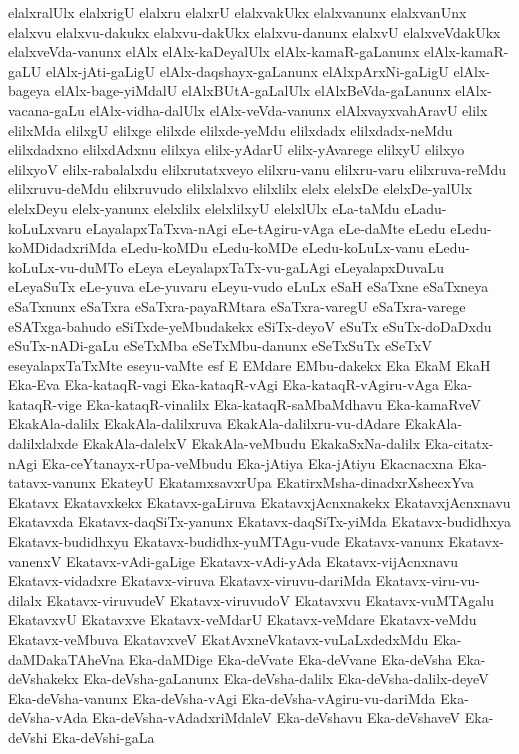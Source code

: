 {elalxralUlx
elalxrigU
elalxru
elalxrU
elalxvakUkx
elalxvanunx
elalxvanUnx
elalxvu
elalxvu-dakukx
elalxvu-dakUkx
elalxvu-danunx
elalxvU
elalxveVdakUkx
elalxveVda-vanunx
elAlx
elAlx-kaDeyalUlx
elAlx-kamaR-gaLanunx
elAlx-kamaR-gaLU
elAlx-jAti-gaLigU
elAlx-daqshayx-gaLanunx
elAlxpArxNi-gaLigU
elAlx-bageya
elAlx-bage-yiMdalU
elAlxBUtA-gaLalUlx
elAlxBeVda-gaLanunx
elAlx-vacana-gaLu
elAlx-vidha-dalUlx
elAlx-veVda-vanunx
elAlxvayxvahAravU
elilx
elilxMda
elilxgU
elilxge
elilxde
elilxde-yeMdu
elilxdadx
elilxdadx-neMdu
elilxdadxno
elilxdAdxnu
elilxya
elilx-yAdarU
elilx-yAvarege
elilxyU
elilxyo
elilxyoV
elilx-rabalalxdu
elilxrutatxveyo
elilxru-vanu
elilxru-varu
elilxruva-reMdu
elilxruvu-deMdu
elilxruvudo
elilxlalxvo
elilxlilx
elelx
elelxDe
elelxDe-yalUlx
elelxDeyu
elelx-yanunx
elelxlilx
elelxlilxyU
elelxlUlx
eLa-taMdu
eLadu-koLuLxvaru
eLayalapxTaTxva-nAgi
eLe-tAgiru-vAga
eLe-daMte
eLedu
eLedu-koMDidadxriMda
eLedu-koMDu
eLedu-koMDe
eLedu-koLuLx-vanu
eLedu-koLuLx-vu-duMTo
eLeya
eLeyalapxTaTx-vu-gaLAgi
eLeyalapxDuvaLu
eLeyaSuTx
eLe-yuva
eLe-yuvaru
eLeyu-vudo
eLuLx
eSaH
eSaTxne
eSaTxneya
eSaTxnunx
eSaTxra
eSaTxra-payaRMtara
eSaTxra-varegU
eSaTxra-varege
eSATxga-bahudo
eSiTxde-yeMbudakekx
eSiTx-deyoV
eSuTx
eSuTx-doDaDxdu
eSuTx-nADi-gaLu
eSeTxMba
eSeTxMbu-danunx
eSeTxSuTx
eSeTxV
eseyalapxTaTxMte
eseyu-vaMte
esf
E
EMdare
EMbu-dakekx
Eka
EkaM
EkaH
Eka-Eva
Eka-kataqR-vagi
Eka-kataqR-vAgi
Eka-kataqR-vAgiru-vAga
Eka-kataqR-vige
Eka-kataqR-vinalilx
Eka-kataqR-saMbaMdhavu
Eka-kamaRveV
EkakAla-dalilx
EkakAla-dalilxruva
EkakAla-dalilxru-vu-dAdare
EkakAla-dalilxlalxde
EkakAla-dalelxV
EkakAla-veMbudu
EkakaSxNa-dalilx
Eka-citatx-nAgi
Eka-ceYtanayx-rUpa-veMbudu
Eka-jAtiya
Eka-jAtiyu
Ekacnacxna
Eka-tatavx-vanunx
EkateyU
EkatamxsavxrUpa
EkatirxMsha-dinadxrXshecxYva
Ekatavx
Ekatavxkekx
Ekatavx-gaLiruva
EkatavxjAcnxnakekx
EkatavxjAcnxnavu
Ekatavxda
Ekatavx-daqSiTx-yanunx
Ekatavx-daqSiTx-yiMda
Ekatavx-budidhxya
Ekatavx-budidhxyu
Ekatavx-budidhx-yuMTAgu-vude
Ekatavx-vanunx
Ekatavx-vanenxV
Ekatavx-vAdi-gaLige
Ekatavx-vAdi-yAda
Ekatavx-vijAcnxnavu
Ekatavx-vidadxre
Ekatavx-viruva
Ekatavx-viruvu-dariMda
Ekatavx-viru-vu-dilalx
Ekatavx-viruvudeV
Ekatavx-viruvudoV
Ekatavxvu
Ekatavx-vuMTAgalu
EkatavxvU
Ekatavxve
Ekatavx-veMdarU
Ekatavx-veMdare
Ekatavx-veMdu
Ekatavx-veMbuva
EkatavxveV
EkatAvxneVkatavx-vuLaLxdedxMdu
Eka-daMDakaTAheVna
Eka-daMDige
Eka-deVvate
Eka-deVvane
Eka-deVsha
Eka-deVshakekx
Eka-deVsha-gaLanunx
Eka-deVsha-dalilx
Eka-deVsha-dalilx-deyeV
Eka-deVsha-vanunx
Eka-deVsha-vAgi
Eka-deVsha-vAgiru-vu-dariMda
Eka-deVsha-vAda
Eka-deVsha-vAdadxriMdaleV
Eka-deVshavu
Eka-deVshaveV
Eka-deVshi
Eka-deVshi-gaLa
}
